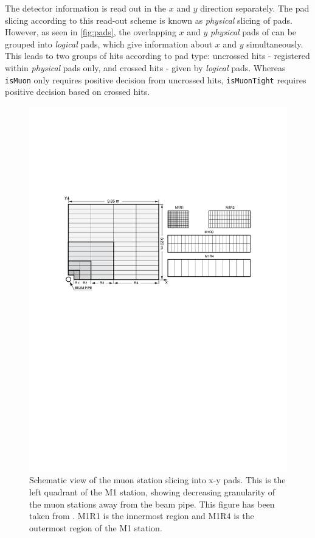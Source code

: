 \color{black}

The detector information is read out in the $x$ and $y$ direction separately. The pad slicing according to this read-out scheme is known as \textit{physical} slicing of pads. However, as seen in \autoref{fig:pads}, the overlapping $x$ and $y$ \textit{physical} pads of can be grouped into \textit{logical} pads, which give information about $x$ and $y$ simultaneously. This leads to two groups of hits according to pad type: uncrossed hits - registered within \textit{physical} pads only, and crossed hits - given by \textit{logical} pads. Whereas \texttt{isMuon} only requires positive decision from uncrossed hits, \texttt{isMuonTight} requires positive decision based on crossed hits. 


\begin{figure}[!h]
        \centering
        \includegraphics[width = 1.0\textwidth]{figs/trimuon/fig2.pdf}
        \caption{Schematic view of the muon station slicing into x-y pads. This is the left quadrant of the M1 station, showing decreasing granularity of the muon stations away from the beam pipe. This figure has been taken from \cite{LHCb-DP-2012-002}. M1R1 is the innermost region and M1R4 is the outermost region of the M1 station. }
        \label{fig:pads}
\end{figure}

